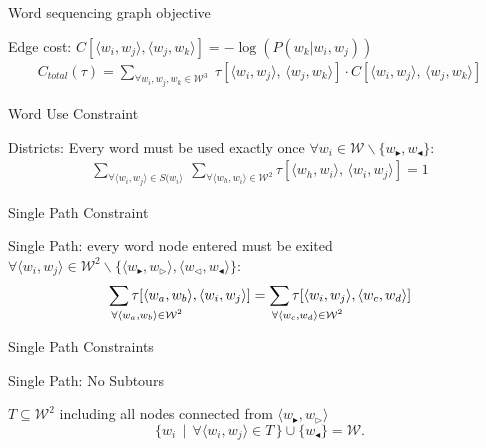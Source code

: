 \documentclass[]{beamer}
\newcommand{\fullwidthtikz}[1]{\resizebox{0.9\textwidth}{!}{
		\centering
		}}
\newcommand{\s}{w_{\blacktriangleright}}
\renewcommand{\ss}{w_{\triangleright}}
\newcommand{\e}{w_{\triangleleft}}
\newcommand{\ee}{w_{\blacktriangleleft}}
\newcommand{\W}{\mathcal{W}}
\newcommand{\displayunskip}{\vspace{0pt}}
\begin{document}
\begin{frame}{Word sequencing graph objective}
	\vspace{-1em}
	\fullwidthtikz{../figs/ordergraphpaper}
	
	\alert{Edge cost:} $C[\langle w_{i},w_{j}\rangle,\langle w_{j},w_{k}\rangle]=-\log\left(P(w_{k}|w_{i},w_{j})\right)$
	\displayunskip
	\begin{gather*}
	C_{total}(\tau)= \sum_{\forall w_i,w_j,w_k \in \W^{3}}
		\;\tau[\langle w_{i},w_{j}\rangle,\,\langle w_{j},w_{k}\rangle] \cdot C[\langle w_{i},w_{j}\rangle,\,\langle w_{j},w_{k}\rangle]
	\end{gather*}

\end{frame}


\begin{frame}{Word Use Constraint}
	\vspace{-1em}
	\fullwidthtikz{../figs/ordergraphpaper}
	
	\alert{Districts:} Every word must be used exactly once
	$\forall w_{i}\in\W\backslash\{\s,\ee\}$:
	\displayunskip
	\begin{gather*}
	\sum_{\forall\langle w_{i},w_{j}\rangle\in S(w_{i}\rangle} \:
	\sum_{\forall\langle w_{h},w_{i}\rangle\in\W^{2}}
	\tau[\langle w_{h},w_{i}\rangle,\,\langle w_{i},w_{j}\rangle]=1
	\end{gather*}
\end{frame}



\begin{frame}{Single Path Constraint}
	\vspace{-1em}
	\fullwidthtikz{../figs/ordergraphpaper}
	
	\alert{Single Path:} every word node entered must be exited
	\\$\forall\langle w_{i},w_{j}\rangle\in\W^{2}\backslash\{\langle\s,\ss\rangle,\langle\e,\ee\rangle\}$: 
	\begin{gather*}%
	\sum_{\mathrlap{\!\!\!\!\forall\langle w_{a},w_{b}\rangle\in\W^{2}}}\tau[\langle w_{a},w_{b}\rangle,\langle w_{i},w_{j}\rangle]
	=\sum_{\mathrlap{\!\!\!\!\forall\langle w_{c},w_{d}\rangle\in\W^{2}}}\tau[\langle w_{i},w_{j}\rangle,\langle w_{c},w_{d}\rangle]
	\end{gather*}
\end{frame}

\begin{frame}{Single Path Constraints}
	\vspace{-1em}
	\fullwidthtikz{../figs/ordergraphpaper}
	
	\alert{Single Path:} No Subtours
	
	$T\subseteq \W^{2}$ including all nodes connected from $\langle\s,\ss\rangle$
	\[\{w_{i}\,\mid\,\forall\langle w_{i},w_{j}\rangle\in T\,\}\cup\{\ee\} = \W.\]
\end{frame}
\end{document}
